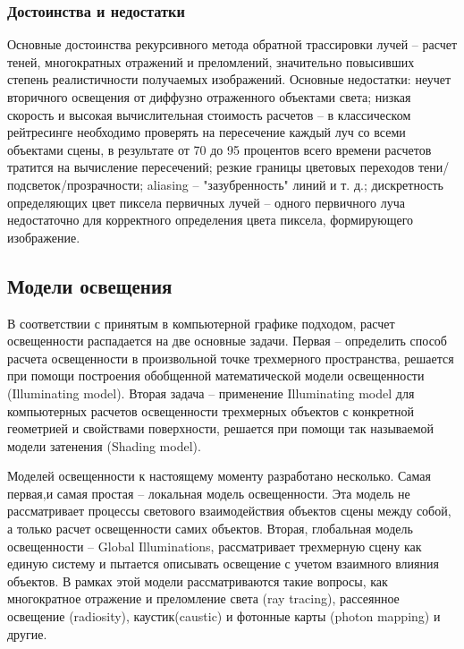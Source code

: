 \documentclass[12pt, a4paper]{article}
\begin{document}
\subsubsection{Достоинства и недостатки}

Основные достоинства рекурсивного метода обратной трассировки лучей – расчет теней, многократных отражений и преломлений, значительно повысивших степень реалистичности получаемых изображений.
Основные недостатки: неучет вторичного освещения от диффузно отраженного объектами света; низкая скорость и высокая вычислительная стоимость расчетов – в классическом рейтресинге необходимо проверять на пересечение каждый луч со всеми объектами сцены, в результате от 70 до 95 процентов всего времени расчетов тратится на вычисление пересечений; резкие границы цветовых переходов тени/подсветок/прозрачности; aliasing – "зазубренность" линий и т. д.; дискретность определяющих цвет пиксела первичных лучей – одного первичного луча недостаточно для корректного определения цвета пиксела, формирующего изображение.


\subsection{Модели освещения}

В соответствии с принятым в компьютерной графике подходом, расчет освещенности распадается на две основные задачи. Первая – определить способ расчета освещенности в произвольной точке трехмерного пространства, решается при помощи построения обобщенной математической модели освещенности (Illuminating model). Вторая задача – применение Illuminating model для компьютерных расчетов освещенности трехмерных объектов с конкретной геометрией и свойствами поверхности, решается при помощи так называемой модели затенения (Shading model).

Моделей освещенности к настоящему моменту разработано несколько. Самая первая,и самая простая – локальная модель освещенности. Эта модель не рассматривает процессы светового взаимодействия объектов сцены между собой, а только расчет освещенности самих объектов. Вторая, глобальная модель освещенности – Global Illuminations, рассматривает трехмерную сцену как единую систему и пытается описывать освещение с учетом взаимного влияния объектов. В рамках этой модели рассматриваются такие вопросы, как многократное отражение и преломление света (ray tracing), рассеянное освещение (radiosity), каустик(caustic) и фотонные карты (photon mapping) и другие. 
\end{document}
